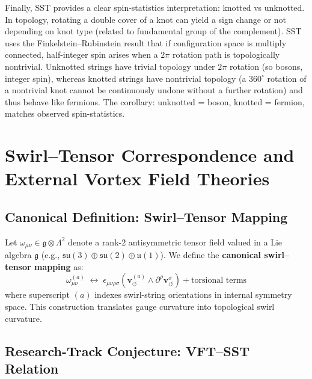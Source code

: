 \documentclass[10pt,reprint,aps,onecolumn,nofootinbib]{revtex4-2}
\begin{document}
    Finally, SST provides a clear spin-statistics interpretation: knotted vs unknotted. In topology, rotating a double cover of a knot can yield a sign change or not depending on knot type (related to fundamental group of the complement). SST uses the Finkelstein–Rubinstein result that if configuration space is multiply connected, half-integer spin arises when a $2\pi$ rotation path is topologically nontrivial. Unknotted strings have trivial topology under $2\pi$ rotation (so bosons, integer spin), whereas knotted strings have nontrivial topology (a $360^\circ$ rotation of a nontrivial knot cannot be continuously undone without a further rotation) and thus behave like fermions. The corollary: unknotted = boson, knotted = fermion, matches observed spin-statistics.

    \section{Swirl–Tensor Correspondence and External Vortex Field Theories}
    \label{sec:swirl_tensor_correspondence}

    \subsection*{Canonical Definition: Swirl–Tensor Mapping}

        Let $\omega_{\mu\nu} \in \mathfrak{g} \otimes \Lambda^2$ denote a rank-2 antisymmetric tensor field valued in a Lie algebra $\mathfrak{g}$ (e.g., $\mathfrak{su}(3) \oplus \mathfrak{su}(2) \oplus \mathfrak{u}(1)$). We define the \textbf{canonical swirl–tensor mapping} as:
        \begin{equation}
            \omega_{\mu\nu}^{(a)} \;\longleftrightarrow\; \epsilon_{\mu\nu\rho\sigma} \left( \mathbf{v}_{\!\boldsymbol{\circlearrowleft}}^{(a)} \wedge \partial^\rho \mathbf{v}^{\sigma}_{\!\boldsymbol{\circlearrowleft}} \right) + \text{torsional terms}
        \end{equation}
        where superscript $(a)$ indexes swirl-string orientations in internal symmetry space. This construction translates gauge curvature into topological swirl curvature.

    \subsection*{Research-Track Conjecture: VFT–SST Relation}
\end{document}
